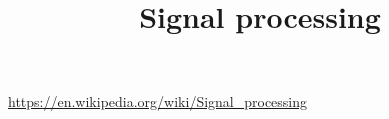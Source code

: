 \documentclass[a4paper]{article}
\title{Signal processing}
\date{}
\begin{document}
    \maketitle
    
    \url{https://en.wikipedia.org/wiki/Signal_processing}
\end{document}

